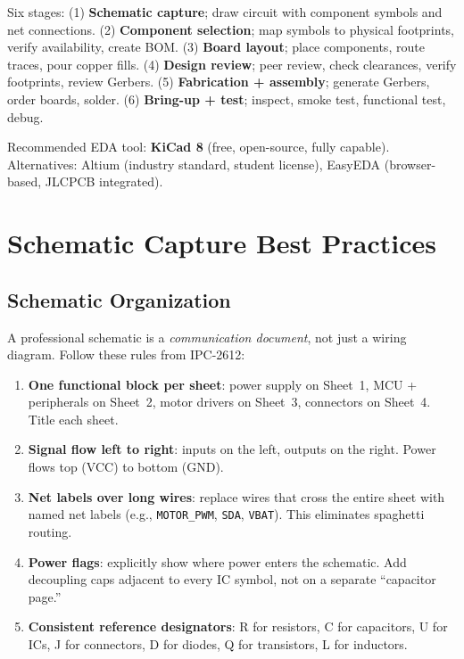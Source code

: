 Six stages: (1) \textbf{Schematic capture}; draw circuit with component symbols and net connections. (2) \textbf{Component selection}; map symbols to physical footprints, verify availability, create BOM. (3) \textbf{Board layout}; place components, route traces, pour copper fills. (4) \textbf{Design review}; peer review, check clearances, verify footprints, review Gerbers. (5) \textbf{Fabrication + assembly}; generate Gerbers, order boards, solder. (6) \textbf{Bring-up + test}; inspect, smoke test, functional test, debug.

Recommended EDA tool: \textbf{KiCad 8} (free, open-source, fully capable). Alternatives: Altium (industry standard, student license), EasyEDA (browser-based, JLCPCB integrated).


\section{Schematic Capture Best Practices}

\subsection{Schematic Organization}
A professional schematic is a \emph{communication document}, not just a wiring diagram. Follow these rules from IPC-2612:
\begin{enumerate}[nosep,leftmargin=1.5em]
\item \textbf{One functional block per sheet}: power supply on Sheet~1, MCU + peripherals on Sheet~2, motor drivers on Sheet~3, connectors on Sheet~4. Title each sheet.
\item \textbf{Signal flow left to right}: inputs on the left, outputs on the right. Power flows top (VCC) to bottom (GND).
\item \textbf{Net labels over long wires}: replace wires that cross the entire sheet with named net labels (e.g., \texttt{MOTOR\_PWM}, \texttt{SDA}, \texttt{VBAT}). This eliminates spaghetti routing.
\item \textbf{Power flags}: explicitly show where power enters the schematic. Add decoupling caps adjacent to every IC symbol, not on a separate ``capacitor page.''
\item \textbf{Consistent reference designators}: R for resistors, C for capacitors, U for ICs, J for connectors, D for diodes, Q for transistors, L for inductors.
\end{enumerate}

